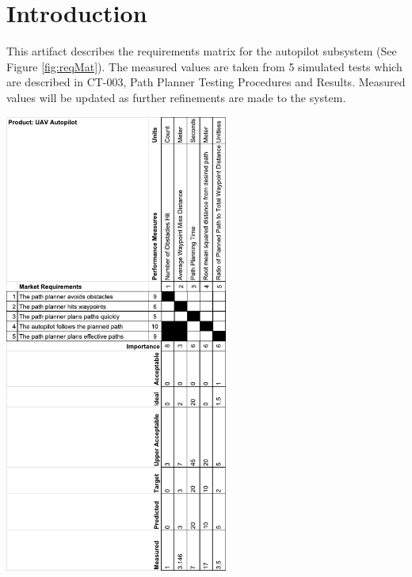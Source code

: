 \documentclass[]{auvsi_doc}
\begin{document}
\begin{AUVSITitlePage}
\begin{artifacttable}
\end{artifacttable}
\end{AUVSITitlePage}

\section{Introduction}
This artifact describes the requirements matrix for the autopilot subsystem (See Figure \ref{fig:reqMat}). The measured values are taken from 5 simulated tests which are described in CT-003, Path Planner Testing Procedures and Results. Measured values will be updated as further refinements are made to the system.

	\begin{center}
	\includegraphics[width=0.55\textwidth]{./figs/RequirementsMatrix.pdf}
	\vspace{2cm}
	\label{fig:reqMat}
	\end{center}

\end{document}
